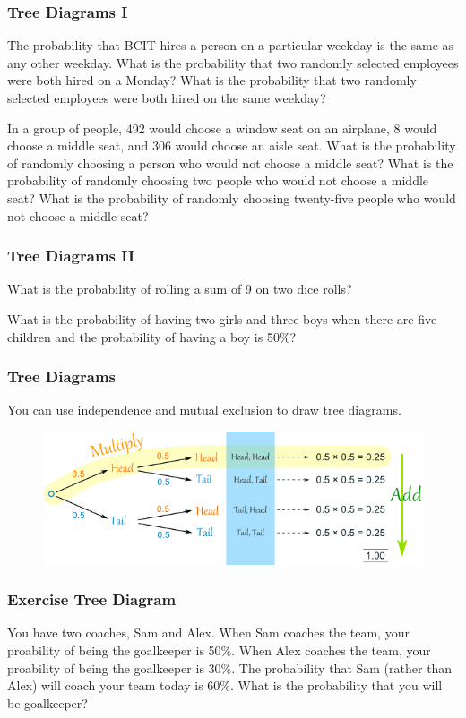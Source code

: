 \documentclass[xcolor=dvipsnames]{beamer}
\begin{document}
\begin{frame}
  \frametitle{Tree Diagrams I}
{\ubung} The probability that BCIT hires a person on a
particular weekday is the same as any other weekday. What is the
probability that two randomly selected employees were both hired on a
Monday? What is the probability that two randomly selected employees
were both hired on the same weekday?

{\ubung} In a group of people, 492 would choose a window
seat on an airplane, 8 would choose a middle seat, and 306 would
choose an aisle seat. What is the probability of randomly choosing a
person who would not choose a middle seat? What is the probability of
randomly choosing two people who would not choose a middle seat? What
is the probability of randomly choosing twenty-five people who would
not choose a middle seat?
\end{frame}

\begin{frame}
  \frametitle{Tree Diagrams II}
{\ubung} What is the probability of rolling a sum of 9 on
two dice rolls?

{\ubung} What is the probability of having two girls and
three boys when there are five children and the probability of having
a boy is 50\%?
\end{frame}

\begin{frame}
  \frametitle{Tree Diagrams}
You can use independence and mutual exclusion to draw tree diagrams.
\begin{figure}[h]
\includegraphics[scale=.5]{./diagrams/tree.png}
\end{figure}
\end{frame}

\begin{frame}
  \frametitle{Exercise Tree Diagram}
{\ubung} You have two coaches, Sam and Alex. When Sam
coaches the team, your proability of being the goalkeeper is 50\%. When Alex
coaches the team, your proability of being the goalkeeper is 30\%. The
probability that Sam (rather than Alex) will coach your team today is
60\%. What is the probability that you will be goalkeeper?
\end{frame}
\end{document}
